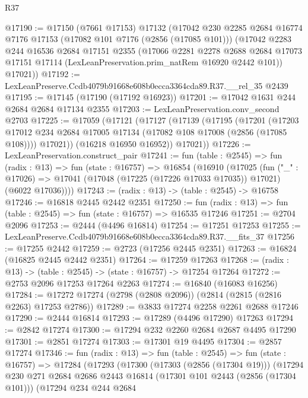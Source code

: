 \begin{lexlean}{R37}
\begin{coremodule}
@17190 := @17150
    (@7661 @17153)
    @17132
    (@17042
      @230
      @2285
      @2684
      @16774
      @7176
      @17153
      (@17082 @101 @7176 (@2856 (@17085 @101)))
      (@17042
        @2283
        @244
        @16536
        @2684
        @17151
        @2355
        (@17066
          @2281
          @2278
          @2688
          @2684
          @17073
          @17151
          @17114
          (LexLeanPreservation.prim_natRem @16920 @2442 @101))
        @17021))
@17192 := LexLeanPreserve.Ccdb4079b91668e608b0ecca3364cda89.R37.__rel_35 @2439
@17195 := @17145 (@17190 (@17192 @16923))
@17201 := @17042 @1631 @244 @2684 @2684 @17134 @2355
@17203 := LexLeanPreservation.conv_second @2703
@17225 := @17059
    (@17121
      (@17127
        (@17139
          (@17195
            (@17201
              (@17203 @17012 @234 @2684 @17005 @17134 (@17082 @108 @17008 (@2856 (@17085 @108))))
              @17021))
          (@16218 @16950 @16952))
        @17021))
@17226 := LexLeanPreservation.construct_pair
@17241 := fun (table : @2545) =>
  fun (radix : @13) =>
  fun (state : @16757) =>
  @16854
    (@16910
      (@17025
        (fun ("_" : @17026) =>
        @17041 (@17048 (@17225 (@17226 @17033 @17035)) @17021) (@6022 @17036))))
@17243 := (radix : @13) -> (table : @2545) -> @16758
@17246 := @16818 @2445 @2442 @2351
@17250 := fun (radix : @13) => fun (table : @2545) => fun (state : @16757) => @16535 @17246
@17251 := @2704 @2096
@17253 := @2444 (@4496 @16814)
@17254 := @17251 @17253
@17255 := LexLeanPreserve.Ccdb4079b91668e608b0ecca3364cda89.R37.__fits_37
@17256 := @17255 @2442
@17259 := @2723 (@17256 @2445 @2351)
@17263 := @16824 (@16825 @2445 @2442 @2351)
@17264 := @17259 @17263
@17268 := (radix : @13) -> (table : @2545) -> (state : @16757) -> @17254 @17264
@17272 := @2753 @2096 @17253 @17264 @2263
@17274 := @16840 (@16083 @16256)
@17284 := @17272 @17274 (@2798 (@2808 @2096)) (@2814 (@2815 (@2816 @2263) @17253 @2786))
@17289 := @3833 @17274 @2258 @2261 @2688 @17246
@17290 := @2444 @16814
@17293 := @17289 (@4496 @17290) @17263
@17294 := @2842 @17274
@17300 := @17294 @232 @2260 @2684 @2687 @4495 @17290
@17301 := @2851 @17274
@17303 := @17301 @19 @4495
@17304 := @2857 @17274
@17346 := fun (radix : @13) =>
  fun (table : @2545) =>
  fun (state : @16757) =>
  @17284
    (@17293
      (@17300
        (@17303 (@2856 (@17304 @19)))
        (@17294
          @230
          @271
          @2684
          @2686
          @2443
          @16814
          (@17301 @101 @2443 (@2856 (@17304 @101)))
          (@17294
            @234
            @244
            @2684

\end{coremodule}
\end{lexlean}
